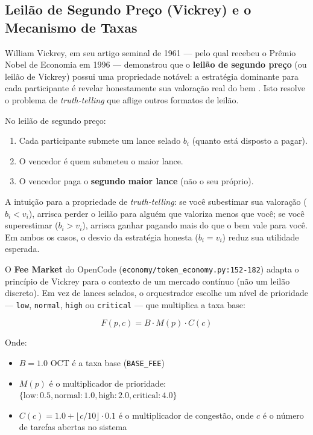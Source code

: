 \subsection{Leilão de Segundo Preço (Vickrey) e o Mecanismo de Taxas}

William Vickrey, em seu artigo seminal de 1961 --- pelo qual recebeu o Prêmio Nobel de Economia em 1996 --- demonstrou que o \textbf{leilão de segundo preço} (ou leilão de Vickrey) possui uma propriedade notável: a estratégia dominante para cada participante é revelar honestamente sua valoração real do bem \cite{vickrey1961counterspeculation}. Isto resolve o problema de \textit{truth-telling} que aflige outros formatos de leilão.

No leilão de segundo preço:
\begin{enumerate}
    \item Cada participante submete um lance selado $b_i$ (quanto está disposto a pagar).
    \item O vencedor é quem submeteu o maior lance.
    \item O vencedor paga o \textbf{segundo maior lance} (não o seu próprio).
\end{enumerate}

A intuição para a propriedade de \textit{truth-telling}: se você subestimar sua valoração ($b_i < v_i$), arrisca perder o leilão para alguém que valoriza menos que você; se você superestimar ($b_i > v_i$), arrisca ganhar pagando mais do que o bem vale para você. Em ambos os casos, o desvio da estratégia honesta ($b_i = v_i$) reduz sua utilidade esperada.

O \textbf{Fee Market} do OpenCode (\texttt{economy/token\_economy.py:152-182}) adapta o princípio de Vickrey para o contexto de um mercado contínuo (não um leilão discreto). Em vez de lances selados, o orquestrador escolhe um nível de prioridade --- \texttt{low}, \texttt{normal}, \texttt{high} ou \texttt{critical} --- que multiplica a taxa base:

\begin{equation}\label{eq:fee_calculation}
F(p, c) = B \cdot M(p) \cdot C(c)
\end{equation}

Onde:
\begin{itemize}
    \item $B = 1.0$ OCT é a taxa base (\texttt{BASE\_FEE})
    \item $M(p)$ é o multiplicador de prioridade: $\{\text{low}: 0.5, \text{normal}: 1.0, \text{high}: 2.0, \text{critical}: 4.0\}$
    \item $C(c) = 1.0 + \lfloor c/10 \rfloor \cdot 0.1$ é o multiplicador de congestão, onde $c$ é o número de tarefas abertas no sistema
\end{itemize}

